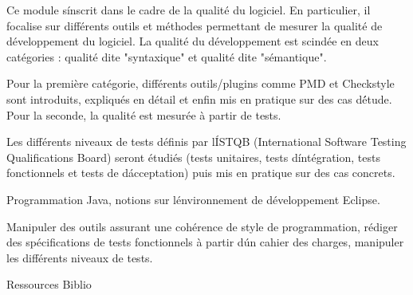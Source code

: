 {
Ce module s\'inscrit dans le cadre de la qualité du logiciel. En particulier, il
focalise sur différents outils et méthodes permettant de mesurer la qualité
de développement du logiciel. La qualité du développement est scindée en
deux catégories : qualité dite "syntaxique" et qualité dite "sémantique".

Pour la première catégorie, différents outils/plugins comme PMD et
Checkstyle sont introduits, expliqués en détail et enfin mis en pratique sur
des cas d\'étude. Pour la seconde, la qualité est mesurée à partir de tests.

Les différents niveaux de tests définis par l\'ISTQB (International Software
Testing Qualifications Board) seront étudiés (tests unitaires, tests
d\'intégration, tests fonctionnels et tests de d\'acceptation) puis mis en
pratique sur des cas concrets.
} 
{Programmation Java, notions sur l\'environnement de développement Eclipse.} 
{\begin{itemize} 
  \ObjItem Manipuler des outils assurant une cohérence de style de programmation,
rédiger des spécifications de tests fonctionnels à partir d\'un cahier des
charges, manipuler les différents niveaux de tests.
\end{itemize} 
} 
{Ressources} 
{Biblio} 
 
\vfill

